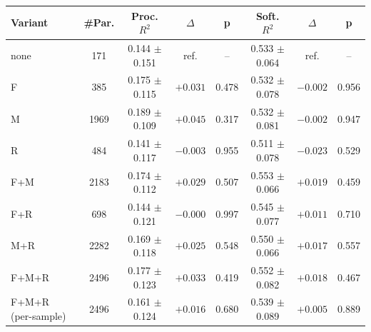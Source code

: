 \begin{tabular}{lccccccc}
\hline
Variant & \#Par. & Proc. $R^2$ & $\Delta$ & p & Soft. $R^2$ & $\Delta$ & p \\
\hline
none & 171 & 0.144 $\pm$ 0.151 & ref. & -- & 0.533 $\pm$ 0.064 & ref. & -- \\
F & 385 & 0.175 $\pm$ 0.115 & $+0.031$ & 0.478 & 0.532 $\pm$ 0.078 & $-0.002$ & 0.956 \\
M & 1969 & 0.189 $\pm$ 0.109 & $+0.045$ & 0.317 & 0.532 $\pm$ 0.081 & $-0.002$ & 0.947 \\
R & 484 & 0.141 $\pm$ 0.117 & $-0.003$ & 0.955 & 0.511 $\pm$ 0.078 & $-0.023$ & 0.529 \\
F+M & 2183 & 0.174 $\pm$ 0.112 & $+0.029$ & 0.507 & 0.553 $\pm$ 0.066 & $+0.019$ & 0.459 \\
F+R & 698 & 0.144 $\pm$ 0.121 & $-0.000$ & 0.997 & 0.545 $\pm$ 0.077 & $+0.011$ & 0.710 \\
M+R & 2282 & 0.169 $\pm$ 0.118 & $+0.025$ & 0.548 & 0.550 $\pm$ 0.066 & $+0.017$ & 0.557 \\
F+M+R & 2496 & 0.177 $\pm$ 0.123 & $+0.033$ & 0.419 & 0.552 $\pm$ 0.082 & $+0.018$ & 0.467 \\
F+M+R (per-sample) & 2496 & 0.161 $\pm$ 0.124 & $+0.016$ & 0.680 & 0.539 $\pm$ 0.089 & $+0.005$ & 0.889 \\
\hline
\end{tabular}
